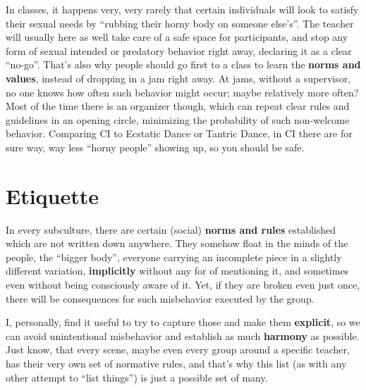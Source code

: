 In classes, it happens very, very rarely that certain individuals will look to satisfy their sexual needs by ``rubbing their horny body on someone else's''.
The teacher will usually here as well take care of a safe space for participants, and stop any form of sexual intended or predatory behavior right away, declaring it as a clear ``no-go''.
That's also why people should go first to a class to learn the \textbf{norms and values}, instead of dropping in a jam right away.
At jams, without a supervisor, no one knows how often such behavior might occur; maybe relatively more often?
Most of the time there is an organizer though, which can repeat clear rules and guidelines in an opening circle, minimizing the probability of such non-welcome behavior.
Comparing CI to Ecstatic Dance or Tantric Dance, in CI there are for sure way, way less ``horny people'' showing up, so you should be safe.

\section{Etiquette}\label{sec:etiquette}

In every subculture, there are certain (social) \textbf{norms and rules} established which are not written down anywhere.
They somehow float in the minds of the people, the ``bigger body'', everyone carrying an incomplete piece in a slightly different variation, \textbf{implicitly} without any for of mentioning it, and sometimes even without being consciously aware of it.
Yet, if they are broken even just once, there will be consequences for such misbehavior executed by the group.

I, personally, find it useful to try to capture those and make them \textbf{explicit}, so we can avoid unintentional misbehavior and establish as much \textbf{harmony} as possible.
Just know, that every scene, maybe even every group around a specific teacher, has their very own set of normative rules, and that's why this list (as with any other attempt to ``list things'') is just a possible set of many.

